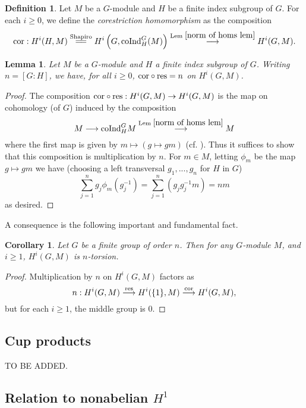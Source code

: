 \documentclass[11pt]{amsart}
\numberwithin{equation}{section}
\newtheorem{lemma}[equation]{Lemma}
\newtheorem{cor}[equation]{Corollary}
\theoremstyle{remark}
\theoremstyle{remark}
\theoremstyle{remark}
\theoremstyle{definition}
\theoremstyle{definition}
\theoremstyle{definition}
\newtheorem{defi}[equation]{Definition}
\theoremstyle{definition}
\theoremstyle{definition}
\theoremstyle{definition}
\begin{document}
\begin{defi}
Let $M$ be a $G$-module and $H$ be a finite index subgroup of $G$. For each $i\geq 0$, we define the \textit{corestriction homomorphism} as the composition
\[\textup{cor}:H^i(H,M)\stackrel{\textup{Shapiro}}{=\joinrel=}H^i\left(G,\textup{coInd}_{H}^G(M)\right)\stackrel{\textup{Lem }\ref{norm of homs lem}}{\longrightarrow}H^i(G,M).\]
\end{defi}

\begin{lemma}
Let $M$ be a $G$-module and $H$ a finite index subgroup of $G$. Writing $n=[G:H]$, we have, for all $i\geq0$, $\textup{cor}\circ \textup{res}=n$ on $H^i(G,M)$.
\end{lemma}

\begin{proof}
The composition $\textup{cor}\circ \textup{res}:H^i(G,M)\rightarrow H^i(G,M)$ is the map on cohomology (of $G$) induced by the composition
\[M\longrightarrow \textup{coInd}_{H}^GM\stackrel{\textup{Lem }\ref{norm of homs lem}}{\longrightarrow} M\]  
where the first map is given by $m\mapsto (g\mapsto gm)$ (cf. ). Thus it suffices to show that this composition is multiplication by $n$. For $m\in M$, letting $\phi_m$ be the map $g\mapsto gm$ we have (choosing a left transversal $g_1,...,g_n$ for $H$ in $G$)
\[\sum_{j=1}^ng_j\phi_m(g_j^{-1})=\sum_{j=1}^n(g_j g_j^{-1}m)=nm\]
as desired. 
\end{proof}

A consequence is the following important and fundamental fact.

\begin{cor} \label{order of finite group coh}
Let $G$ be a finite group of order $n$. Then for any $G$-module $M$, and $i\geq 1$, $H^i(G,M)$ is $n$-torsion. 
\end{cor}

\begin{proof}
Multiplication by $n$ on $H^i(G,M)$ factors as
\[n:H^i(G,M)\stackrel{\textup{res}}{\longrightarrow} H^i(\{1\},M) \stackrel{\textup{cor}}{\longrightarrow}H^i(G,M),\]
but for each $i\geq 1$, the middle group is $0$. 
\end{proof}

\subsection{Cup products}

TO BE ADDED.

\subsection{Relation to nonabelian $H^1$}
\end{document}
